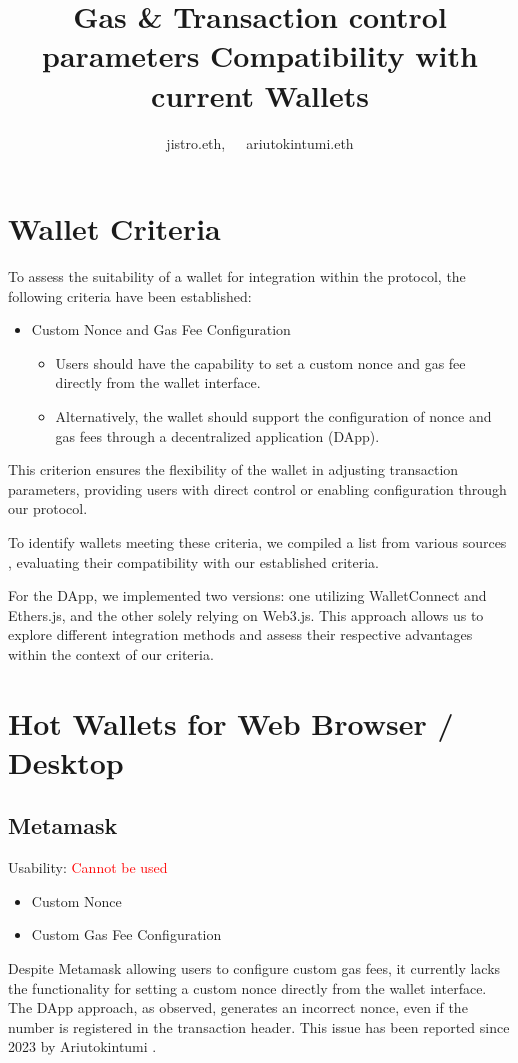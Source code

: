 \documentclass[fleqn,10pt]{olplainarticle}
\title{Gas \& Transaction control parameters Compatibility with current Wallets}
\author[1]{jistro.eth,~~~ariutokintumi.eth}
\newcommand{\cmark}{\ding{51}}%
\newcommand{\xmark}{\ding{55}}%
\begin{document}
\flushbottom
\maketitle
\thispagestyle{empty}

\tableofcontents

\section{Wallet Criteria}

To assess the suitability of a wallet for integration within the protocol, the following criteria have been established:

\begin{itemize}[noitemsep]
	\item Custom Nonce and Gas Fee Configuration
	\begin{itemize}[noitemsep, nolistsep]
		\item Users should have the capability to set a custom nonce and gas fee directly from the wallet interface.
		\item Alternatively, the wallet should support the configuration of nonce and gas fees through a decentralized application (DApp).
	\end{itemize}
\end{itemize}

This criterion ensures the flexibility of the wallet in adjusting transaction parameters, providing users with direct control or enabling configuration through our protocol.

To identify wallets meeting these criteria, we compiled a list from various sources \cite{walletconnect_explorer_nodate}, evaluating their compatibility with our established criteria.

For the DApp, we implemented two versions: one utilizing WalletConnect and Ethers.js, and the other solely relying on Web3.js. This approach allows us to explore different integration methods and assess their respective advantages within the context of our criteria.


\section{Hot Wallets for Web Browser / Desktop}

\subsection{Metamask}
Usability: \textcolor{red}{Cannot be used}
\begin{itemize}[noitemsep, nolistsep]
	\item [\textcolor{red}{\xmark}] Custom Nonce
	\item [\textcolor{green}{\cmark}] Custom Gas Fee Configuration
\end{itemize}
Despite Metamask allowing users to configure custom gas fees, it currently lacks the functionality for setting a custom nonce directly from the wallet interface. The DApp approach, as observed, generates an incorrect nonce, even if the number is registered in the transaction header. This issue has been reported since 2023 by Ariutokintumi \cite{ariutokintumi_BugReceived_2023}.
\end{document}
